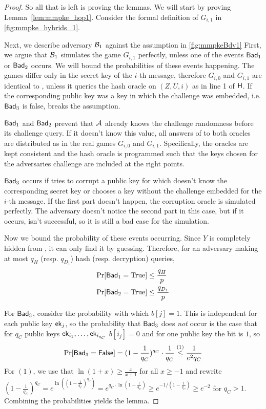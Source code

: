 \begin{proof}
  So all that is left is proving the lemmas.
  We will start by proving Lemma~\ref{lem:mmpke_hop1}. Consider the formal definition of $G_{i,1}$ in \cref{fig:mmpke_hybrids_1}.
  

  Next, we describe adversary $\Bdv[1]$ against the \sdh assumption in \cref{fig:mmpkeBdv1}
  First, we argue that $\Bdv[1]$ simulates the game $G_{i,1}$ perfectly, unless one of the events $\term{Bad}_1$ or
  $\term{Bad}_2$ occurs. We will bound the probabilities of these events happening. The games differ only in the
  secret key of the $i$-th message, therefore $G_{i,0}$ and $G_{i,1}$ are identical to
  \Adv, unless it queries the hash oracle on $(Z, U, i)$ as in line 1 of $\term{H}$. If the
  corresponding public key was a key in which the challenge was embedded, i.e. $\term{Bad}_3$ is false, \Bdv[1] breaks
  the \sdh assumption.

  $\term{Bad}_1$ and $\term{Bad}_2$ prevent that $\Adv$ already knows the challenge randomness before its challenge
  query. If it doesn't know this value, all answers of \Bdv[1] to both oracles are distributed as in the real games $G_{i,0}$
  and $G_{i,1}$. Specifically, the oracles are kept consistent and the hash oracle is programmed such that the keys chosen
  for the adversaries challenge are included at the right points.

  $\term{Bad}_3$ occurs if \Adv tries to corrupt a public key for which \Bdv[1] doesn't know the corresponding secret
  key or \Adv chooses a key without the challenge embedded for the $i$-th message. If the first part doesn't happen, the
  corruption oracle is simulated perfectly. The adversary doesn't notice the second part in this case, but if it occurs,
  \Bdv[1] isn't successful, so it is still a bad case for the simulation.

  Now we bound the probability of these events occurring. Since $Y$ is completely hidden from \Adv, it can only find it by
  guessing. Therefore, for an adversary \Adv making at most $q_H$ (resp. $q_{D_1}$) hash (resp. decryption) queries,
  \begin{align*}
    \Pr[\term{Bad}_1 = \text{True}] &\leq \frac{q_{H}}{p} \\
    \Pr[\term{Bad}_2 = \text{True}] &\leq \frac{q_{D_1}}{p}
  \end{align*}

  For $\term{Bad}_3$, consider the probability with which $b[j] = 1$. This is independent for each public key
  $\mmpkepk_j$, so the probability that $\term{Bad}_3$ does \emph{not} occur is the case that for $q_C$ public keys
  $\mmpkepk_{i_1},\ldots,\mmpkepk_{i_{q_C}}$ $b[i_j] = 0$ and for one public key the bit is $1$, so
  \[
    \Pr[\term{Bad}_3 = \term{False}] = (1-\frac{1}{q_C})^{q_C}\cdot \frac{1}{q_C} \overset{(1)}{\leq} \frac{1}{e^2q_C}
  \]
  For $(1)$, we use that $\ln(1+x) \geq \frac{x}{x+1}$ for all $x \geq -1$ and rewrite $(1-\frac{1}{q_C})^{q_C} =
  e^{\ln((1-\frac{1}{q_C})^{q_C})} = e^{q_C\cdot\ln(1-\frac{1}{q_C})} \geq e^{-1/(1-\frac{1}{q_C})} \geq e^{-2}$ for
  $q_C > 1$.
  Combining the probabilities yields the lemma.


\end{proof}
